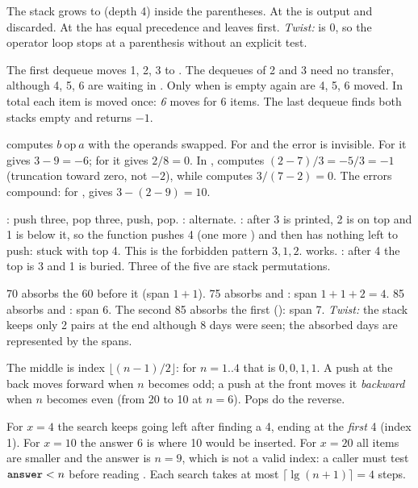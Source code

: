 The stack grows to \cc{+ * ( -} (depth 4) inside the parentheses. At \cc{)} the \cc{-} is
output and \cc{(} discarded. At \cc{/} the \cc{*} has equal precedence and leaves first.
\emph{Twist:}  is 0, so the operator loop stops at a parenthesis without an
explicit test.

The first dequeue moves 1, 2, 3 to . The dequeues of 2 and 3 need no transfer,
although 4, 5, 6 are waiting in . Only when  is empty again are 4, 5, 6
moved. In total each item is moved once: \emph{6} moves for 6 items. The last dequeue
finds both stacks empty and returns $-1$.

 computes $b\ \mathrm{op}\ a$ with the operands swapped. For \cc{+} and
\cc{*} the error is invisible. For  it gives $3-9=-6$; for  it gives
$2/8=0$. In ,  computes $(2-7)/3=-5/3=-1$ (truncation toward
zero, not $-2$), while  computes $3/(7-2)=0$. The errors compound: for
,  gives $3-(2-9)=10$.

: push three, pop three, push, pop. : alternate. :
after 3 is printed, 2 is on top and 1 is below it, so the function pushes 4 (one more
) and then has nothing left to push: stuck with top 4. This is the forbidden
pattern $3,1,2$.  works. : after 4 the top is 3 and 1 is
buried. Three of the five are stack permutations.

70 absorbs the 60 before it (span $1+1$). 75 absorbs  and : span
$1+1+2=4$. 85 absorbs  and : span 6. The second 85 absorbs the first
(\cc{<=}): span 7. \emph{Twist:} the stack keeps only 2 pairs at the end although 8 days
were seen; the absorbed days are represented by the spans.

The middle is index $\lfloor(n-1)/2\rfloor$: for $n=1..4$ that is $0,0,1,1$. A push at
the back moves  forward when $n$ becomes odd; a push at the front moves it
\emph{backward} when $n$ becomes even (from 20 to 10 at $n=6$). Pops do the reverse.

For $x=4$ the search keeps going left after finding a 4, ending at the \emph{first} 4
(index 1). For $x=10$ the answer 6 is where 10 would be inserted. For $x=20$ all items are
smaller and the answer is $n=9$, which is not a valid index: a caller must test
$\texttt{answer}<n$ before reading . Each search takes at most
$\lceil\lg(n+1)\rceil=4$ steps.

